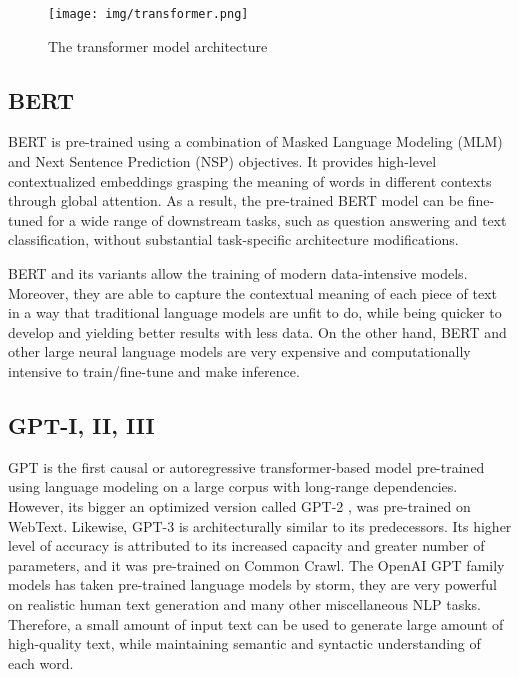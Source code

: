 \documentclass{article}
\begin{document}
\begin{figure}[ht]
    \centering
    \texttt{[image: img/transformer.png]}
    \vspace{.5em}
    \caption{The transformer model architecture \cite{vaswani2017attention}}
    \label{fig:transformer}
\end{figure}

\subsection{BERT}
BERT \cite{devlin2018bert} is pre-trained using a combination of Masked Language Modeling (MLM) and Next Sentence Prediction (NSP) objectives. It provides high-level contextualized embeddings grasping the meaning of words in different contexts through global attention. As a result, the pre-trained BERT model can be fine-tuned for a wide range of downstream tasks, such as question answering and text classification, without substantial task-specific architecture modifications.

BERT and its variants allow the training of modern data-intensive models. Moreover, they are able to capture the contextual meaning of each piece of text in a way that traditional language models are unfit to do, while being quicker to develop and yielding better results with less data. On the other hand, BERT and other large neural language models are very expensive and computationally intensive to train/fine-tune and make inference.

\subsection{GPT-I, II, III}
GPT \cite{radford2018improving} is the first causal or autoregressive transformer-based model pre-trained using language modeling on a large corpus with long-range dependencies. However, its bigger an optimized version called GPT-2 \cite{radford2019language}, was pre-trained on WebText. Likewise, GPT-3 \cite{brown2020language} is architecturally similar to its predecessors. Its higher level of accuracy is attributed to its increased capacity and greater number of parameters, and it was pre-trained on Common Crawl. The OpenAI GPT family models has taken pre-trained language models by storm, they are very powerful on realistic human text generation and many other miscellaneous NLP tasks. Therefore, a small amount of input text can be used to generate large amount of high-quality text, while maintaining semantic and syntactic understanding of each word.
\end{document}

